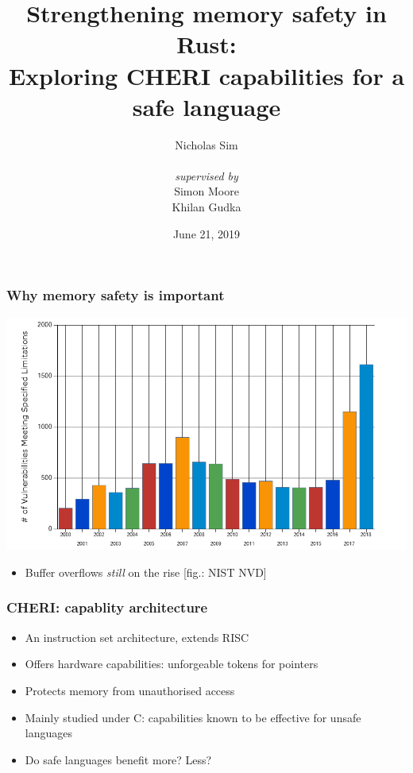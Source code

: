 \documentclass{beamer}
\begin{document}
\title{Strengthening memory safety in Rust:\\
Exploring CHERI capabilities for a safe language}
\author{Nicholas Sim\\~\\
\small \emph{supervised by}\\
Simon Moore\\Khilan Gudka}
\date{June 21, 2019}

\frame{\titlepage}


\begin{frame}
\frametitle{Why memory safety is important}

\includegraphics[width=\textwidth]{graph-overflow.png}
\begin{itemize}
    \item Buffer overflows \emph{still} on the rise [fig.: NIST NVD]
\end{itemize}
\end{frame}


\begin{frame}
\frametitle{CHERI: capablity architecture}

\begin{itemize}
    \item An instruction set architecture, extends RISC
    \item Offers hardware capabilities: unforgeable tokens for pointers
    \item Protects memory from unauthorised access
    \item Mainly studied under C: capabilities known to be effective for
    unsafe languages
    \item Do safe languages benefit more? Less?
\end{itemize}
\end{frame}
\end{document}
